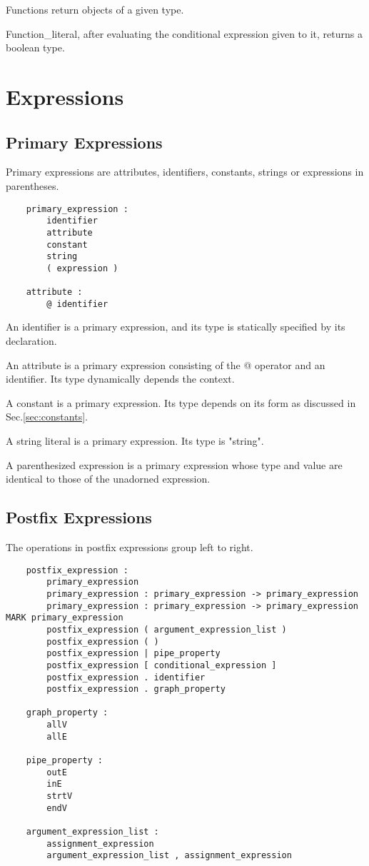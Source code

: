 \documentclass[letterpaper,12pt]{article}
\begin{document}
  Functions return objects of a given type. \newline

  Function\_literal, after evaluating the conditional expression given to it, returns a boolean type.

\section{Expressions}

\subsection{Primary Expressions}
Primary expressions are attributes, identifiers, constants, strings or expressions in parentheses.
\begin{lstlisting}
	primary_expression :
		identifier
		attribute
		constant
		string
		( expression )

	attribute :
		@ identifier
\end{lstlisting}
An identifier is a primary expression, and its type is statically specified by its declaration. \newline 

An attribute is a primary expression consisting of the @ operator and an identifier. Its type dynamically depends the context. \newline

A constant is a primary expression. Its type depends on its form as discussed in Sec.\ref{sec:constants}. \newline

A string literal is a primary expression. Its type is "string". \newline

A parenthesized expression is a primary expression whose type and value are identical to those of the unadorned expression. 

\subsection{Postfix Expressions}
The operations in postfix expressions group left to right.
\begin{lstlisting}
	postfix_expression :
		primary_expression
		primary_expression : primary_expression -> primary_expression
		primary_expression : primary_expression -> primary_expression MARK primary_expression
		postfix_expression ( argument_expression_list )
		postfix_expression ( )
		postfix_expression | pipe_property
		postfix_expression [ conditional_expression ]
		postfix_expression . identifier
		postfix_expression . graph_property

	graph_property :
		allV
		allE

	pipe_property :
		outE
		inE
		strtV
		endV

	argument_expression_list :
		assignment_expression
		argument_expression_list , assignment_expression 
\end{lstlisting}
\end{document}
